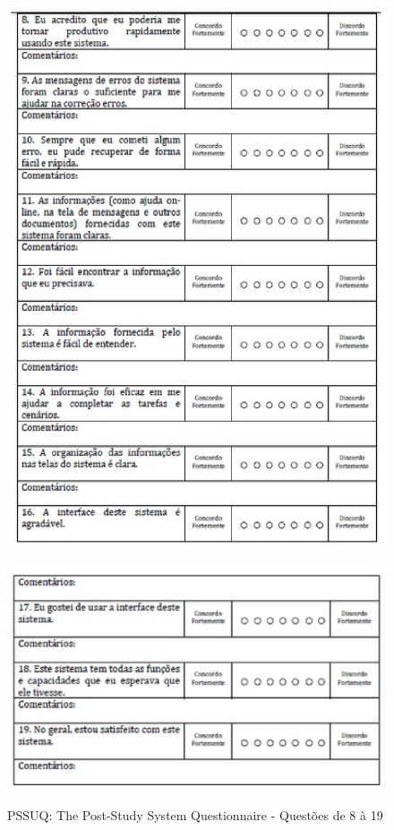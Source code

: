 \newpage

\begin{figure}[!h]
    \centering
    \includegraphics[keepaspectratio=true,scale=0.60]
      {figuras/pssuq02.eps}
    \label{pssuq}
\end{figure}

\begin{figure}[!h]
    \centering
    \includegraphics[keepaspectratio=true,scale=0.60]
      {figuras/pssuq03.eps}
    \label{pssuq}
	\caption{PSSUQ: The Post-Study System Questionnaire - Questões de 8 à 19}
\end{figure}

